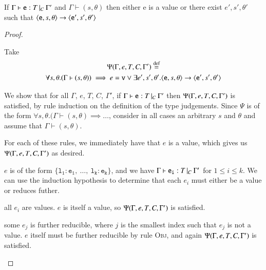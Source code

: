 \begin{theorem}\label{app:expProgress}

  If $\Gamma{}\vdash\mathtt{e}: T\,|_C\:\Gamma'$ and $\Gamma \vdash (s, \theta)$ then either e is a
  value or there exist $e',s', \theta'$ such that $\langle{}\mathtt{e},s,\theta\rangle{}\rightarrow{}\langle{}\mathtt{e'},s',\theta'\rangle$

\end{theorem}

\begin{proof} \label{app:expProgressProof}

  Take 
  \begin{multline*}
  	\Psi(\Gamma, e, T, C, \Gamma') \stackrel{\text{def}}{=} \\
  	\forall s,\theta. (\Gamma \vdash (s,\theta))\implies e=\mathtt{v}\vee
  	\exists e', s',\theta'. \langle{}\mathtt{e},s,\theta\rangle{}\rightarrow{}\langle{}\mathtt{e'},s',\theta'\rangle
  \end{multline*}

  We show that for all $\Gamma$, $e$, $T$, $C$, $\Gamma'$, if $\Gamma{}\vdash\mathtt{e}: T\,|_C\:\Gamma'$
  then $\Psi(\Gamma, e, T, C, \Gamma')$ is satisfied, by rule induction on the definition of the
  type judgements. Since $\Psi$ is of the form
  $\forall s,\theta.(\Gamma\vdash(s,\theta)\implies\dots$,
  consider in all cases an arbitrary $s$ and $\theta$ and assume that $\Gamma\vdash(s,\theta)$.

  \begin{case}\label{case:prog-values} 

	For each of these rules, we immediately have that $e$ is a value, which
	gives us $\Psi(\Gamma, e, T, C, \Gamma'){}$ as desired.

  \end{case}

  \begin{case}[V\_Obj]\label{case:prog-v_obj}

	$e$ is of the form $\mathtt{\{l_1: e_1,\ \dots,\ l_k: e_k\}}$, and we have $\Gamma{}\vdash\mathtt{e_i}: T\,|_C\:\Gamma'$ for $1 \leq i \leq k$.
	We can use the induction hypothesis to determine that each $e_i$ must
	either be a value or reduces futher.
	\begin{subcase}
	  all $e_i$ are values. 
	  $e$ is itself a value, so $\Psi(\Gamma, e, T, C, \Gamma')$ is
	  satisfied.
  	\end{subcase}
  	\begin{subcase}
  	  some $e_j$ is further reducible,
  	  where $j$ is the smallest index such
  	  that $e_j$ is not a value. $e$ itself must be further reducible by
  	  rule \textsc{Obj}, and again $\Psi(\Gamma, e, T, C, \Gamma')$ is satisfied.
	\end{subcase}
  \end{case}


\end{proof}
